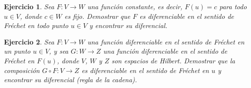 \documentclass[11pt]{report}
\newtheorem{ex}{Ejercicio}
\newenvironment{solution}{\begin{proof}[Solución]}{\end{proof}}
\newcommand{\norma}[1]{\Vert #1 \Vert_V}
\begin{document}
\begin{ex}
Sea $F: V \to W$ una función constante, es decir, $F(u) = c$ para todo $u \in V$, donde $c \in W$ es fijo. Demostrar que $F$ es diferenciable en el sentido de Fréchet en todo punto $u \in V$ y encontrar su diferencial.
\end{ex}


\begin{ex}
Sea $F: V \to W$ una función diferenciable en el sentido de Fréchet en un punto $u \in V$, y sea $G: W \to Z$ una función diferenciable en el sentido de Fréchet en $F(u)$, donde $V$, $W$ y $Z$ son espacios de Hilbert. Demostrar que la composición $G \circ F: V \to Z$ es diferenciable en el sentido de Fréchet en $u$ y encontrar su diferencial (regla de la cadena).
\end{ex}

\end{document}
